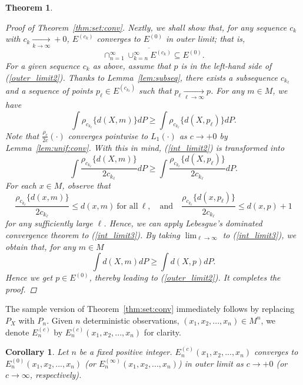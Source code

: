 \documentclass[preprint]{imsart}
\theoremstyle{plain}
\newtheorem{theorem}{Theorem}
\newtheorem{corollary}{Corollary}
\theoremstyle{remark}
\begin{document}
\begin{appendix}
\begin{theorem}
\begin{proof}[Proof of Theorem~\ref{thm:set:conv}]
Nextly, we shall show that, for any sequence $c_{k}$ with $c_{k} \underset{k \rightarrow \infty}{\rightarrow} +0$, $E^{(c_{k})}$ converges to $E^{(0)}$ in outer limit; that is,
 \begin{equation}\label{outer_limit2}
 \cap_{n=1}^{\infty} \overline{\cup_{k=n}^{\infty} E^{(c_{k})}} \subseteq E^{(0)}.
 \end{equation}
 For a given sequence $c_{k}$ as above, assume that $p$ is in the left-hand side of (\ref{outer_limit2}). Thanks to Lemma~\ref{lem:subseq}, there exists a subsequence $c_{k_\ell}$ and a sequence of points $p_{{\ell}} \in E^{(c_{k_{\ell}})}$ such that $p_{\ell} \underset{\ell \rightarrow \infty}{\rightarrow} p$. For any $m \in M$, we have 
 \begin{equation}\label{int_limit2}
 \int \rho_{c_{k_\ell}}\{d(X, m)\} dP \ge \int \rho_{c_{k_\ell}}\{d(X, p_{\ell})\} dP.
 \end{equation}
 Note that $\frac{\rho_{c}}{2c}(\cdot)$ converges pointwise to $L_{1}(\cdot)$ as $c\rightarrow +0$ by Lemma~\ref{lem:unif:conv}. With this in mind, (\ref{int_limit2}) is transformed into
 \begin{equation}\label{int_limit3}
 \int \frac{\rho_{c_{k_\ell}}\{d(X, m)\}}{2c_{k_\ell}}dP \ge \int \frac{\rho_{c_{k_\ell}}\{d(X, p_{\ell})\}}{2c_{k_\ell}} dP.
\end{equation} 
For each $x \in M$, observe that $$\frac{\rho_{c_{k_\ell}}\{d(x, m)\}}{2c_{k_{\ell}}} \le d(x, m) ~ \mbox{for all} ~ \ell, \quad \mbox{and} \quad \frac{\rho_{c_{k_\ell}}\{d(x, p_{\ell})\}}{2c_{k_{\ell}}} \le d(x, p) + 1$$ 
for any sufficiently large $\ell$. Hence, we can apply Lebesgue's dominated convergence theorem to (\ref{int_limit3}). By taking $\lim_{\ell \rightarrow \infty}$ to (\ref{int_limit3}), we obtain that, for any $m \in M$  
\[
\int d(X, m) dP \ge \int d(X, p) dP.
\]
Hence we get $p \in E^{(0)}$, thereby leading to (\ref{outer_limit2}). It completes the proof.
\end{proof}
\end{theorem}


The sample version of Theorem~\ref{thm:set:conv} immediately follows by replacing $P_{X}$ with $P_{n}$. Given $n$ deterministic observations, $(x_{1}, x_{2}, ..., x_{n}) \in M^{n}$, we denote $E^{(c)}_{n}$ by $E^{(c)}_{n}(x_{1}, x_{2}, ..., x_{n})$ for clarity.
\begin{corollary}\label{cor:conv:sam}
Let $n$ be a fixed positive integer. $E_{n}^{(c)}(x_{1}, x_{2}, ..., x_{n})$ converges to $E_{n}^{(0)}(x_{1}, x_{2}, ..., x_{n})$ (or $E^{(\infty)}_{n}(x_{1}, x_{2}, ..., x_{n})$) in outer limit as $c \rightarrow +0$ (or $c \rightarrow \infty$, respectively).
\end{corollary}




\end{appendix}
\end{document}
